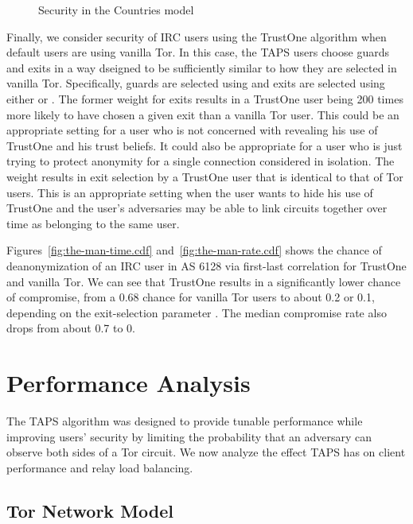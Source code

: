 \documentclass[conference]{styles/IEEEtran}
\newcommand{\ps}{TAPS\xspace}
\begin{document}
\begin{figure}[t]
\vspace{-4mm}
\caption{\small Security in the \textsf{Countries} model}
\vspace{-4mm}
\label{fig:countries}
\end{figure}
 
Finally, we consider security of IRC users using the TrustOne algorithm when default users are
using vanilla Tor.
In this case, the \ps users choose guards and exits in a way dseigned to be sufficiently similar to
how they are selected in vanilla Tor. Specifically, guards are selected using
 and
exits are selected using either  or . The former
weight for exits results in a TrustOne user being 200 times more likely to have chosen a given exit
than a vanilla Tor user. This could be an appropriate setting for a user who is not concerned with
revealing his use of TrustOne and his trust beliefs. It could also be
appropriate for a user who
is just trying to protect anonymity for a single connection considered in isolation. The weight
 results in exit selection by a TrustOne user that is identical
to that of Tor users. This is an appropriate setting when the user wants to hide his use of
TrustOne and the user's adversaries may be able to link circuits together over time as belonging to
the same user.

Figures~\ref{fig:the-man-time.cdf} and~\ref{fig:the-man-rate.cdf} shows the chance of deanonymization of an IRC user in AS 6128 via first-last correlation
for TrustOne and vanilla Tor. We can see that TrustOne results in a significantly
lower chance of compromise, from a 0.68 chance for vanilla Tor users to about 0.2 or 0.1,
depending on the exit-selection parameter . The median compromise rate also drops
from about 0.7 to 0. \section{Performance Analysis}\label{sec:perf}

The \ps algorithm was designed to provide tunable
performance while improving users' security by limiting the probability that an
adversary can observe both sides of a Tor circuit. We now analyze the effect \ps
has on client performance and relay load balancing.



\subsection{Tor Network Model}
\end{document}
